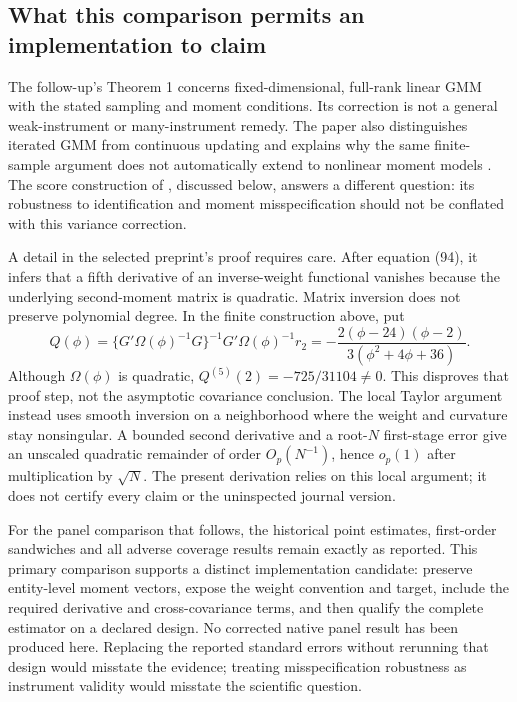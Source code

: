 \subsection{What this comparison permits an implementation to claim}
The follow-up's Theorem 1 concerns fixed-dimensional, full-rank linear
GMM with the stated sampling and moment conditions. Its correction is
not a general weak-instrument or many-instrument remedy. The paper also
distinguishes iterated GMM from continuous updating and explains why the
same finite-sample argument does not automatically extend to nonlinear
moment models \citep[Sections 1, 4--6]{rel32hkl}. The score construction
of \citet{kleibergen2021}, discussed below, answers a different question:
its robustness to identification and moment misspecification should not
be conflated with this variance correction.

A detail in the selected preprint's proof requires care. After equation
(94), it infers that a fifth derivative of an inverse-weight functional
vanishes because the underlying second-moment matrix is quadratic.
Matrix inversion does not preserve polynomial degree. In the finite
construction above, put
\[
 Q(\phi)=\{G'\Omega(\phi)^{-1}G\}^{-1}
              G'\Omega(\phi)^{-1}r_2
       =-\frac{2(\phi-24)(\phi-2)}{3(\phi^2+4\phi+36)}.
\]
Although $\Omega(\phi)$ is quadratic, $Q^{(5)}(2)=-725/31104\ne0$.
This disproves that proof step, not the asymptotic covariance conclusion.
The local Taylor argument instead uses smooth inversion on a neighborhood
where the weight and curvature stay nonsingular. A bounded second
derivative and a root-$N$ first-stage error give an unscaled quadratic
remainder of order $O_p(N^{-1})$, hence $o_p(1)$ after multiplication
by $\sqrt N$. The present derivation relies on this local argument;
it does not certify every claim or the uninspected journal version.

For the panel comparison that follows, the historical point estimates,
first-order sandwiches and all adverse coverage results remain exactly
as reported. This primary comparison supports a distinct implementation
candidate: preserve entity-level moment vectors, expose the weight
convention and target, include the required derivative and cross-covariance
terms, and then qualify the complete estimator on a declared design.
No corrected native panel result has been produced here. Replacing the
reported standard errors without rerunning that design would misstate
the evidence; treating misspecification robustness as instrument validity
would misstate the scientific question.

